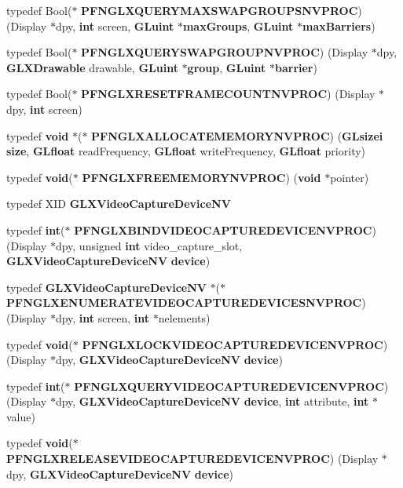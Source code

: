 \begin{DoxyCompactItemize}
typedef Bool($\ast$ {\bf P\+F\+N\+G\+L\+X\+Q\+U\+E\+R\+Y\+M\+A\+X\+S\+W\+A\+P\+G\+R\+O\+U\+P\+S\+N\+V\+P\+R\+OC}) (Display $\ast$dpy, {\bf int} screen, {\bf G\+Luint} $\ast${\bf max\+Groups}, {\bf G\+Luint} $\ast${\bf max\+Barriers})
\item 
typedef Bool($\ast$ {\bf P\+F\+N\+G\+L\+X\+Q\+U\+E\+R\+Y\+S\+W\+A\+P\+G\+R\+O\+U\+P\+N\+V\+P\+R\+OC}) (Display $\ast$dpy, {\bf G\+L\+X\+Drawable} drawable, {\bf G\+Luint} $\ast${\bf group}, {\bf G\+Luint} $\ast${\bf barrier})
\item 
typedef Bool($\ast$ {\bf P\+F\+N\+G\+L\+X\+R\+E\+S\+E\+T\+F\+R\+A\+M\+E\+C\+O\+U\+N\+T\+N\+V\+P\+R\+OC}) (Display $\ast$dpy, {\bf int} screen)
\item 
typedef {\bf void} $\ast$($\ast$ {\bf P\+F\+N\+G\+L\+X\+A\+L\+L\+O\+C\+A\+T\+E\+M\+E\+M\+O\+R\+Y\+N\+V\+P\+R\+OC}) ({\bf G\+Lsizei} {\bf size}, {\bf G\+Lfloat} read\+Frequency, {\bf G\+Lfloat} write\+Frequency, {\bf G\+Lfloat} priority)
\item 
typedef {\bf void}($\ast$ {\bf P\+F\+N\+G\+L\+X\+F\+R\+E\+E\+M\+E\+M\+O\+R\+Y\+N\+V\+P\+R\+OC}) ({\bf void} $\ast$pointer)
\item 
typedef X\+ID {\bf G\+L\+X\+Video\+Capture\+Device\+NV}
\item 
typedef {\bf int}($\ast$ {\bf P\+F\+N\+G\+L\+X\+B\+I\+N\+D\+V\+I\+D\+E\+O\+C\+A\+P\+T\+U\+R\+E\+D\+E\+V\+I\+C\+E\+N\+V\+P\+R\+OC}) (Display $\ast$dpy, unsigned {\bf int} video\+\_\+capture\+\_\+slot, {\bf G\+L\+X\+Video\+Capture\+Device\+NV} {\bf device})
\item 
typedef {\bf G\+L\+X\+Video\+Capture\+Device\+NV} $\ast$($\ast$ {\bf P\+F\+N\+G\+L\+X\+E\+N\+U\+M\+E\+R\+A\+T\+E\+V\+I\+D\+E\+O\+C\+A\+P\+T\+U\+R\+E\+D\+E\+V\+I\+C\+E\+S\+N\+V\+P\+R\+OC}) (Display $\ast$dpy, {\bf int} screen, {\bf int} $\ast$nelements)
\item 
typedef {\bf void}($\ast$ {\bf P\+F\+N\+G\+L\+X\+L\+O\+C\+K\+V\+I\+D\+E\+O\+C\+A\+P\+T\+U\+R\+E\+D\+E\+V\+I\+C\+E\+N\+V\+P\+R\+OC}) (Display $\ast$dpy, {\bf G\+L\+X\+Video\+Capture\+Device\+NV} {\bf device})
\item 
typedef {\bf int}($\ast$ {\bf P\+F\+N\+G\+L\+X\+Q\+U\+E\+R\+Y\+V\+I\+D\+E\+O\+C\+A\+P\+T\+U\+R\+E\+D\+E\+V\+I\+C\+E\+N\+V\+P\+R\+OC}) (Display $\ast$dpy, {\bf G\+L\+X\+Video\+Capture\+Device\+NV} {\bf device}, {\bf int} attribute, {\bf int} $\ast$value)
\item 
typedef {\bf void}($\ast$ {\bf P\+F\+N\+G\+L\+X\+R\+E\+L\+E\+A\+S\+E\+V\+I\+D\+E\+O\+C\+A\+P\+T\+U\+R\+E\+D\+E\+V\+I\+C\+E\+N\+V\+P\+R\+OC}) (Display $\ast$dpy, {\bf G\+L\+X\+Video\+Capture\+Device\+NV} {\bf device})

\end{DoxyCompactItemize}
